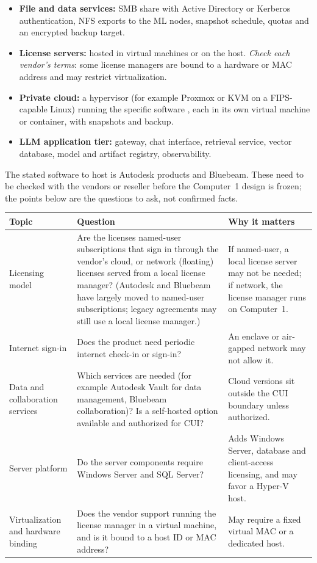 \begin{itemize}
  \item \textbf{File and data services:} SMB share with Active Directory or
    Kerberos authentication, NFS exports to the ML nodes, snapshot schedule,
    quotas and an encrypted backup target.
  \item \textbf{License servers:} hosted in virtual machines or on the host.
    \emph{Check each vendor's terms}: some license managers are bound to a
    hardware or MAC address and may restrict virtualization.
  \item \textbf{Private cloud:} a hypervisor (for example Proxmox or KVM on a
    FIPS-capable Linux) running the specific software , each in its
    own virtual machine or container, with snapshots and backup.
  \item \textbf{LLM application tier:} gateway, chat interface, retrieval
    service, vector database, model and artifact registry, observability.
\end{itemize}


The stated software to host is Autodesk products and Bluebeam. These need to be checked
with the vendors or reseller before the Computer~1 design is frozen; the points below are
the questions to ask, not confirmed facts.

{\footnotesize
\begin{xltabular}{\textwidth}{@{}Y{0.636} Y{1.364} Y{1.0}@{}}
  \toprule
  Topic & Question & Why it matters \\
  \midrule
  \endhead
  Licensing model & Are the licenses named-user subscriptions that sign in through the vendor's cloud, or network (floating) licenses served from a local license manager? (Autodesk and Bluebeam have largely moved to named-user subscriptions; legacy agreements may still use a local license manager.) & If named-user, a local license server may not be needed; if network, the license manager runs on Computer~1. \\
  Internet sign-in & Does the product need periodic internet check-in or sign-in? & An enclave or air-gapped network may not allow it. \\
  Data and collaboration services & Which services are needed (for example Autodesk Vault for data management, Bluebeam collaboration)? Is a self-hosted option available and authorized for CUI? & Cloud versions sit outside the CUI boundary unless authorized. \\
  Server platform & Do the server components require Windows Server and SQL Server? & Adds Windows Server, database and client-access licensing, and may favor a Hyper-V host. \\
  Virtualization and hardware binding & Does the vendor support running the license manager in a virtual machine, and is it bound to a host ID or MAC address? & May require a fixed virtual MAC or a dedicated host. \\
  \bottomrule
\end{xltabular}}

